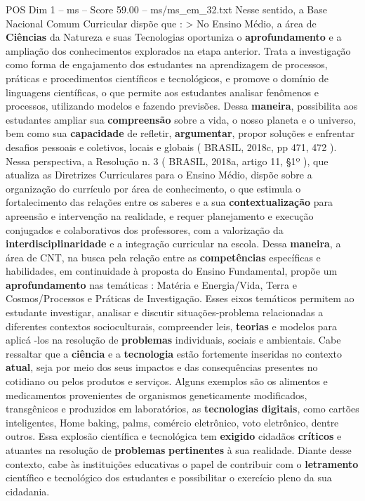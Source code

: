 \begin{textsample}{POS Dim 1 – ms – Score 59.00 – ms/ms\_em\_32.txt}
Nesse sentido, a Base Nacional Comum Curricular dispõe que : > No Ensino Médio, a área de \textbf{Ciências} da Natureza e suas Tecnologias oportuniza o \textbf{aprofundamento} e a ampliação dos conhecimentos explorados na etapa anterior.
Trata a investigação como forma de engajamento dos estudantes na aprendizagem de processos, práticas e procedimentos científicos e tecnológicos, e promove o domínio de linguagens científicas, o que permite aos estudantes analisar fenômenos e processos, utilizando modelos e fazendo previsões.
Dessa \textbf{maneira}, possibilita aos estudantes ampliar sua \textbf{compreensão} sobre a vida, o nosso planeta e o universo, bem como sua \textbf{capacidade} de refletir, \textbf{argumentar}, propor soluções e enfrentar desafios pessoais e coletivos, locais e globais ( BRASIL, 2018c, pp 471, 472 ).
Nessa perspectiva, a Resolução n. 3 ( BRASIL, 2018a, artigo 11, §1º ), que atualiza as Diretrizes Curriculares para o Ensino Médio, dispõe sobre a organização do currículo por área de conhecimento, o que estimula o fortalecimento das relações entre os saberes e a sua \textbf{contextualização} para apreensão e intervenção na realidade, e requer planejamento e execução conjugados e colaborativos dos professores, com a valorização da \textbf{interdisciplinaridade} e a integração curricular na escola.
Dessa \textbf{maneira}, a área de CNT, na busca pela relação entre as \textbf{competências} específicas e habilidades, em continuidade à proposta do Ensino Fundamental, propõe um \textbf{aprofundamento} nas temáticas : Matéria e Energia/Vida, Terra e Cosmos/Processos e Práticas de Investigação.
Esses eixos temáticos permitem ao estudante investigar, analisar e discutir situações-problema relacionadas a diferentes contextos socioculturais, compreender leis, \textbf{teorias} e modelos para aplicá -los na resolução de \textbf{problemas} individuais, sociais e ambientais.
Cabe ressaltar que a \textbf{ciência} e a \textbf{tecnologia} estão fortemente inseridas no contexto \textbf{atual}, seja por meio dos seus impactos e das consequências presentes no cotidiano ou pelos produtos e serviços.
Alguns exemplos são os alimentos e medicamentos provenientes de organismos geneticamente modificados, transgênicos e produzidos em laboratórios, as \textbf{tecnologias} \textbf{digitais}, como cartões inteligentes, Home baking, palms, comércio eletrônico, voto eletrônico, dentre outros.
Essa explosão científica e tecnológica tem \textbf{exigido} cidadãos \textbf{críticos} e atuantes na resolução de \textbf{problemas} \textbf{pertinentes} à sua realidade.
Diante desse contexto, cabe às instituições educativas o papel de contribuir com o \textbf{letramento} científico e tecnológico dos estudantes e possibilitar o exercício pleno da sua cidadania.

\end{textsample}
